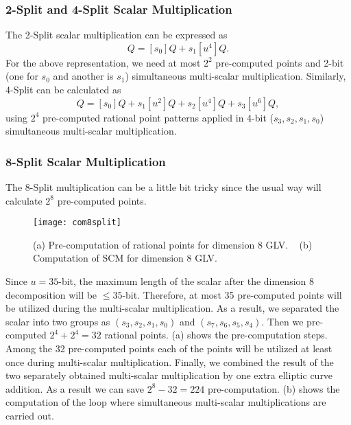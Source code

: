 \subsubsection{2-Split and 4-Split Scalar Multiplication}
The 2-Split scalar multiplication can be expressed as
\begin{equation}
[s]Q = [s_0]Q + s_1 [u^4]Q.
\end{equation}
For the above representation, we need at most $2^2$ pre-computed points and 2-bit (one for $s_0$ and another is $s_1$) simultaneous multi-scalar multiplication.
Similarly, 4-Split can be calculated as 
\begin{equation}
[s]Q = [s_0]Q+s_1[u^2]Q+s_2[u^4]Q+s_3[u^6]Q,
\end{equation}
using $2^4$ pre-computed rational point patterns applied in 4-bit ($s_3,s_2,s_1,s_0$) simultaneous multi-scalar multiplication. 

\subsubsection{8-Split Scalar Multiplication}
The 8-Split multiplication can be a little bit tricky since the usual way will calculate $2^8$ pre-computed points.
\begin{figure*}
\centering
\texttt{[image: com8split]}
\caption{(a) Pre-computation of rational points for dimension 8  GLV. ~ (b) Computation of SCM for dimension 8  GLV.}
\label{precom_figure}
\end{figure*}
Since $u = 35$-bit,  the maximum length of the scalar after the dimension 8 decomposition will be $\leq 35$-bit.
Therefore, at most 35 pre-computed points will be utilized during the multi-scalar multiplication.
As a result, we separated the scalar into two groups as $(s_3,s_2,s_1,s_0)$ and $(s_7,s_6,s_5,s_4)$.
Then we pre-computed $2^4 + 2^4 = 32$ rational points.
(a) shows the pre-computation steps.  
Among the 32 pre-computed points each of the points will be utilized at least once during multi-scalar multiplication. 
Finally, we combined the result of the two separately  obtained multi-scalar multiplication by one extra elliptic curve addition. 
As a result we can save $2^8-32 = 224$ pre-computation. 
(b) shows the computation of the loop where simultaneous multi-scalar multiplications are carried out. 

